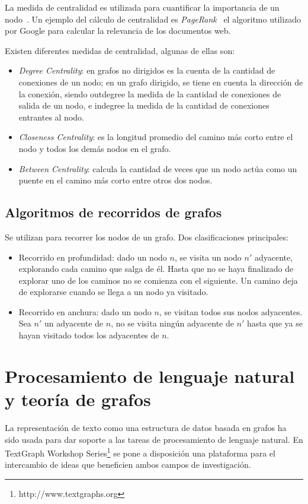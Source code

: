 La medida de centralidad es utilizada para cuantificar la importancia de un nodo~\cite{2018transfer}. Un ejemplo del cálculo de centralidad es \emph{PageRank}~\cite{page1999pagerank} el algoritmo utilizado por Google para calcular la relevancia de los documentos web.

Existen diferentes medidas de centralidad, algunas de ellas son:
\begin{itemize}
    \item \emph{Degree Centrality}: en grafos no dirigidos es la cuenta de la cantidad de conexiones de un nodo; en un grafo dirigido, se tiene en cuenta la dirección de la conexión, siendo outdegree la medida de la cantidad de conexiones de salida de un nodo, e indegree la medida de la cantidad de conexiones entrantes al nodo. 
    \item \emph{Closeness Centrality}: es la longitud promedio del camino más corto entre el nodo y todos los demás nodos en el grafo.
    \item \emph{Between Centrality}: calcula la cantidad de veces que un nodo actúa como un puente en el camino más corto entre otros dos nodos.
\end{itemize}

\subsection{Algoritmos de recorridos de grafos}
Se utilizan para recorrer los nodos de un grafo. Dos clasificaciones principales:
\begin{itemize}
    \item Recorrido en profundidad: dado un nodo $n$, se visita un nodo $n'$ adyacente, explorando cada camino que salga de él. Hasta que no se haya finalizado de explorar uno de los caminos no se comienza con el siguiente. Un camino deja de explorarse cuando se llega a un nodo ya visitado. 
    \item Recorrido en anchura: dado un nodo $n$, se visitan todos sus nodos adyacentes. Sea $n'$ un adyacente de $n$, no se visita ningún adyacente de $n'$ hasta que ya se hayan visitado todos los adyacentes de $n$. 
\end{itemize}

\section{Procesamiento de lenguaje natural y teoría de grafos}
La representación de texto como una estructura de datos basada en grafos ha sido usada para dar soporte a las tareas de procesamiento de lenguaje natural. En TextGraph Workshop Series\footnote{http://www.textgraphs.org} se pone a disposición una plataforma para el intercambio de ideas que beneficien ambos campos de investigación. 

